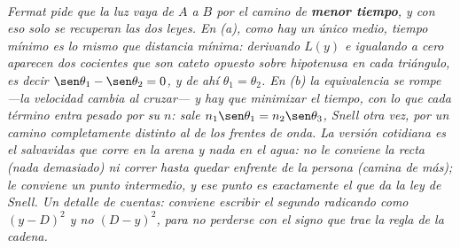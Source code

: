 \begin{center}
\\[0.5em]
{\small\itshape Fermat pide que la luz vaya de $A$ a $B$ por el camino de
\textbf{menor tiempo}, y con eso solo se recuperan las dos leyes. En (a), como
hay un único medio, tiempo mínimo es lo mismo que distancia mínima: derivando
$L(y)$ e igualando a cero aparecen dos cocientes que son \emph{cateto opuesto
sobre hipotenusa} en cada triángulo, es decir $\sen\theta_1 - \sen\theta_2 = 0$,
y de ahí $\theta_1 = \theta_2$. En (b) la equivalencia se rompe ---la velocidad
cambia al cruzar--- y hay que minimizar el tiempo, con lo que cada término entra
pesado por su $n$: sale $n_1\sen\theta_1 = n_2\sen\theta_3$, Snell otra vez, por
un camino completamente distinto al de los frentes de onda. La versión cotidiana
es el salvavidas que corre en la arena y nada en el agua: no le conviene la recta
(nada demasiado) ni correr hasta quedar enfrente de la persona (camina de más);
le conviene un punto intermedio, y ese punto es exactamente el que da la ley de
Snell. Un detalle de cuentas: conviene escribir el segundo radicando como
$(y-D)^2$ y no $(D-y)^2$, para no perderse con el signo que trae la regla de la
cadena.}
\end{center}
